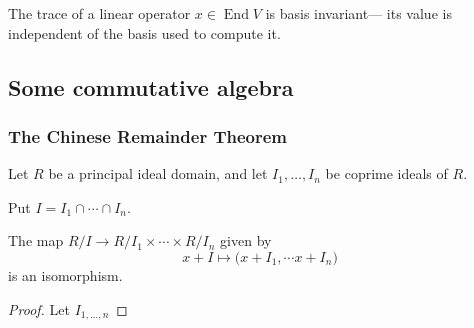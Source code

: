 \documentclass{article}
\DeclareMathOperator{\End}{End}
\begin{document}
\begin{theorem}\label{thm:TraceIsBasisIndependent}
    The trace of a linear operator $x \in \End V$ is basis invariant--- its value is independent of the basis used to compute it.
\end{theorem}

\subsection{Some commutative algebra}

\subsubsection{The Chinese Remainder Theorem}

\begin{theorem}
    Let $R$ be a principal ideal domain, and let $I_1, \ldots, I_n$ be coprime ideals of $R$.

    Put $I = I_1 \cap \cdots \cap I_n$.

    The map $R/I \to R/I_1 \times \cdots \times R/I_n$ given by
    \[
        x + I
        \mapsto
        \Big(
            x + I_1,
            \cdots
            x + I_n
        \Big)
    \]
    is an isomorphism.
\end{theorem}

\begin{proof}
    Let $I_{1,\ldots,n}$
\end{proof}
\end{document}
